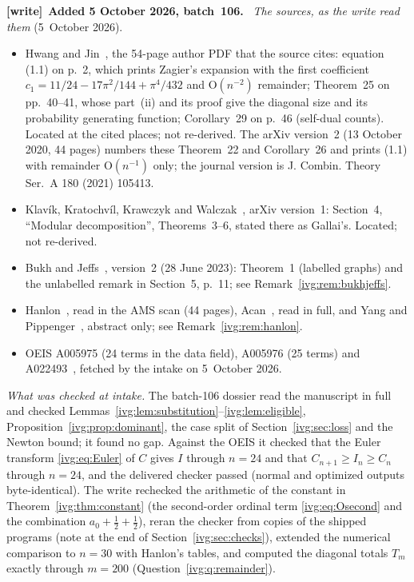 \documentclass[11pt,letterpaper]{article}
\theoremstyle{definition}\newtheorem{definition}[theorem]{Definition}
\theoremstyle{remark}\newtheorem{remark}[theorem]{Remark}
\newcommand{\OO}{\mathrm O}
\newenvironment{writenote}[1][]{\par\smallskip\begingroup\small
 \noindent\textbf{[write]}\if\relax\detokenize{#1}\relax\else~\textbf{#1.}\fi\ }%
 {\par\endgroup\smallskip}
\begin{document}
\begin{writenote}[Added 5 October 2026, batch~106]
\emph{The sources, as the write read them} (5~October 2026).
\begin{itemize}
\item Hwang and Jin~\cite{HJ}, the 54-page author PDF that the source cites:
 equation (1.1) on p.~2, which prints Zagier's expansion with the first
 coefficient $c_1=11/24-17\pi^2/144+\pi^4/432$ and $\OO(n^{-2})$
 remainder; Theorem~25 on pp.~40--41, whose part~(ii) and its proof give the
 diagonal size and its probability generating function; Corollary~29 on
 p.~46 (self-dual counts). Located at the cited places; not re-derived. The
 arXiv version~2 (13 October 2020, 44 pages) numbers these Theorem~22 and
 Corollary~26 and prints (1.1) with remainder $\OO(n^{-1})$ only; the
 journal version is J. Combin. Theory Ser.~A 180 (2021) 105413.
\item Klav\'ik, Kratochv\'il, Krawczyk and Walczak~\cite{Gallai}, arXiv
 version~1: Section~4, ``Modular decomposition'', Theorems~3--6, stated there
 as Gallai's. Located; not re-derived.
\item Bukh and Jeffs~\cite{BJ}, version~2 (28 June 2023): Theorem~1 (labelled
 graphs) and the unlabelled remark in Section~5, p.~11; see
 Remark~\ref{ivg:rem:bukhjeffs}.
\item Hanlon~\cite{Hanlon}, read in the AMS scan (44 pages), Acan~\cite{Acan},
 read in full, and Yang and Pippenger~\cite{YP}, abstract only; see
 Remark~\ref{ivg:rem:hanlon}.
\item OEIS A005975 (24 terms in the data field), A005976 (25 terms) and
 A022493~\cite{OEIS}, fetched by the intake on 5~October 2026.
\end{itemize}

\emph{What was checked at intake.} The batch-106 dossier read the manuscript
in full and checked Lemmas~\ref{ivg:lem:substitution}--\ref{ivg:lem:eligible},
Proposition~\ref{ivg:prop:dominant}, the case split of
Section~\ref{ivg:sec:loss} and the Newton bound; it found no gap. Against the
OEIS it checked that the Euler transform \eqref{ivg:eq:Euler} of $C$ gives
$I$ through $n=24$ and that $C_{n+1}\ge I_n\ge C_n$ through $n=24$, and the
delivered checker passed (normal and optimized outputs byte-identical). The
write rechecked the arithmetic of the constant in
Theorem~\ref{ivg:thm:constant} (the second-order ordinal term
\eqref{ivg:eq:Osecond} and the combination $a_0+\tfrac12+\tfrac12$), reran the
checker from copies of the shipped programs (note at the end of
Section~\ref{ivg:sec:checks}), extended the numerical comparison to $n=30$
with Hanlon's tables, and computed the diagonal totals $T_m$ exactly through
$m=200$ (Question~\ref{ivg:q:remainder}).


\end{writenote}
\end{document}
